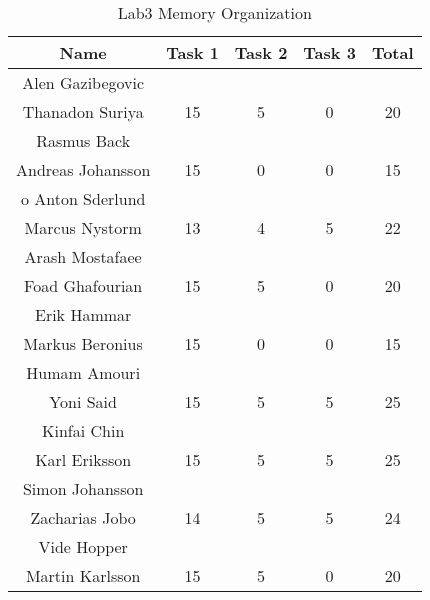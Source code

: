 \documentclass{article}
\begin{document}
\begin{table}[ht]
\caption{Lab3 Memory Organization}
\centering
\begin{tabular}{c c c c c} 
\hline\hline 
Name & Task 1 & Task 2 & Task 3 & Total \\ [0.5ex] 
\hline
Alen Gazibegovic \\ Thanadon Suriya 
& 15 & 5 & 0 & 20 \\
\hline
Rasmus Back \\ Andreas Johansson 
& 15 & 0 & 0 & 15 \\
\hline o
Anton Sderlund \\ Marcus Nystorm
& 13 & 4 & 5 & 22 \\
\hline
Arash Mostafaee \\ Foad Ghafourian
& 15 & 5 & 0 & 20 \\
\hline
Erik Hammar \\ Markus Beronius
& 15 & 0 & 0 & 15 \\
\hline 
Humam Amouri \\ Yoni Said
& 15 & 5 & 5 & 25 \\ 
\hline
Kinfai Chin \\ Karl Eriksson
& 15 & 5 & 5 & 25 \\ 
\hline
Simon Johansson \\ Zacharias Jobo
& 14 & 5 & 5 & 24 \\
\hline
Vide Hopper \\ Martin Karlsson
& 15 & 5 & 0 & 20 \\ [1ex]
\hline
\end{tabular}
\label{table:nonlin}
\end{table}


\end{document}
